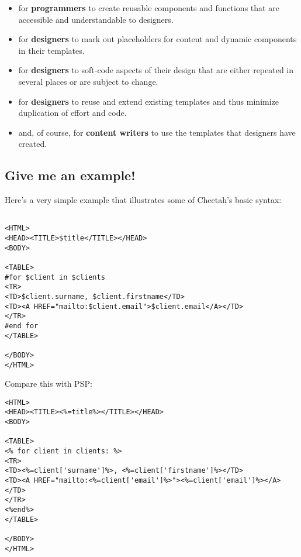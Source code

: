 \begin{itemize}
     \begin{itemize}
     \item for {\bf programmers} to create reusable components and functions
          that are accessible and understandable to designers.
     \item for {\bf designers} to mark out placeholders for content and 
          dynamic components in their templates.
     \item for {\bf designers} to soft-code aspects of their design that are
          either repeated in several places or are subject to change.
     \item for {\bf designers} to reuse and extend existing templates and thus
          minimize duplication of effort and code.
     \item and, of course, for {\bf content writers} to use the templates that
          designers have created.
     \end{itemize}

\end{itemize}

\subsection{Give me an example!}
\label{intro.example}

Here's a very simple example that illustrates some of Cheetah's basic syntax:

\begin{verbatim}

<HTML>
<HEAD><TITLE>$title</TITLE></HEAD>
<BODY>

<TABLE>
#for $client in $clients
<TR>
<TD>$client.surname, $client.firstname</TD>
<TD><A HREF="mailto:$client.email">$client.email</A></TD>
</TR>
#end for
</TABLE>

</BODY>
</HTML>
\end{verbatim}

Compare this with PSP:

\begin{verbatim}
<HTML>
<HEAD><TITLE><%=title%></TITLE></HEAD>
<BODY>

<TABLE>
<% for client in clients: %>
<TR>
<TD><%=client['surname']%>, <%=client['firstname']%></TD>
<TD><A HREF="mailto:<%=client['email']%>"><%=client['email']%></A></TD>
</TR>
<%end%>
</TABLE>

</BODY>
</HTML>
\end{verbatim}

